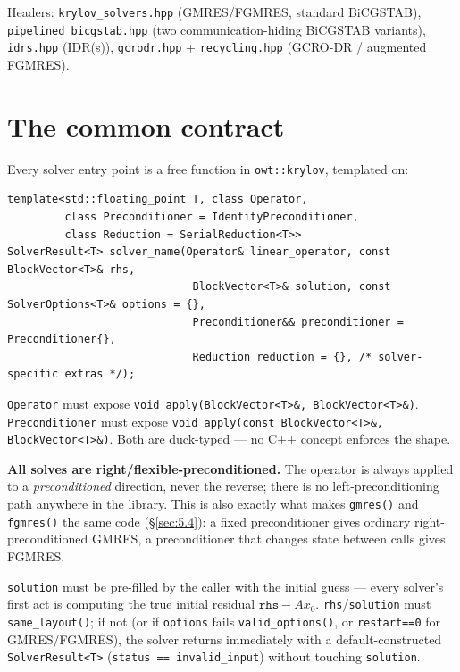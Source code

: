 \documentclass[11pt,a4paper]{report}
\newcommand{\secref}[1]{\S\ref{#1}}
\begin{document}
Headers: \texttt{krylov\_solvers.hpp} (GMRES/FGMRES, standard BiCGSTAB),
\texttt{pipelined\_bicgstab.hpp} (two communication-hiding BiCGSTAB
variants), \texttt{idrs.hpp} (IDR(s)), \texttt{gcrodr.hpp} +
\texttt{recycling.hpp} (GCRO-DR / augmented FGMRES).

\section{The common contract}
\label{sec:5.1}

Every solver entry point is a free function in \lstinline!owt::krylov!,
templated on:

\begin{lstlisting}
template<std::floating_point T, class Operator,
         class Preconditioner = IdentityPreconditioner,
         class Reduction = SerialReduction<T>>
SolverResult<T> solver_name(Operator& linear_operator, const BlockVector<T>& rhs,
                             BlockVector<T>& solution, const SolverOptions<T>& options = {},
                             Preconditioner&& preconditioner = Preconditioner{},
                             Reduction reduction = {}, /* solver-specific extras */);
\end{lstlisting}

\lstinline!Operator! must expose \lstinline!void apply(BlockVector<T>&, BlockVector<T>&)!.
\lstinline!Preconditioner! must expose
\lstinline!void apply(const BlockVector<T>&, BlockVector<T>&)!. Both are
duck-typed --- no C++ concept enforces the shape.

\textbf{All solves are right/flexible-preconditioned.} The operator is
always applied to a \emph{preconditioned} direction, never the reverse;
there is no left-preconditioning path anywhere in the library. This is
also exactly what makes \lstinline!gmres()! and \lstinline!fgmres()! the same code
(\secref{sec:5.4}): a fixed preconditioner gives ordinary
right-preconditioned GMRES, a preconditioner that changes state between
calls gives FGMRES.

\lstinline!solution! must be pre-filled by the caller with the initial guess
--- every solver's first act is computing the true initial residual
$\mathtt{rhs} - A x_0$. \lstinline!rhs!/\lstinline!solution! must \lstinline!same_layout()!; if not
(or if \lstinline!options! fails \lstinline!valid_options()!, or \lstinline!restart==0! for
GMRES/FGMRES), the solver returns immediately with a
default-constructed \lstinline!SolverResult<T>! (\lstinline!status == invalid_input!)
without touching \lstinline!solution!.
\end{document}

